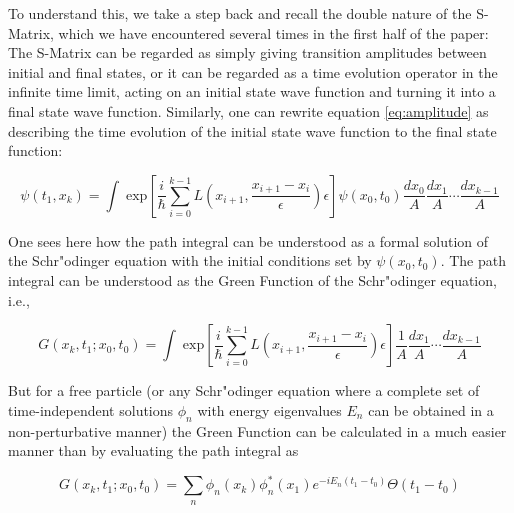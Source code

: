 \documentclass[12pt,a4paper]{article}
\begin{document}
To understand this, we take a step back and recall the double nature of the S-Matrix, which we have encountered several times in the first half of the paper: The S-Matrix can be regarded as simply giving transition amplitudes between initial and final states, or it can be regarded as a time evolution operator in the infinite time limit, acting on an initial state wave function and turning it into a final state wave function. Similarly, one can rewrite equation \ref{eq:amplitude} as describing the time evolution of the initial state wave function to the final state function:

\begin{equation}
\label{eq:amplitude2}
\psi (t_1, x_k)  =   \int  \; \mathrm{exp}\left[ \frac{i}{\hbar} \sum_{i=0}^{k-1} L \left( x_{i+1}, \frac{x_{i+1}-x_i}{\epsilon} \right) \epsilon \right] \psi (x_0, t_0) \frac{dx_0}{A} \frac{dx_1}{A} \cdots \frac{dx_{k-1}}{A} 
\end{equation}

One sees here how the path integral can be understood as a formal solution of the Schr"odinger equation with the initial conditions set by $\psi (x_0, t_0)$. The path integral can be understood as the Green Function of the Schr"odinger equation, i.e.,

\begin{equation}
G(x_k, t_1; x_0, t_0) = \int  \; \mathrm{exp}\left[ \frac{i}{\hbar} \sum_{i=0}^{k-1} L \left( x_{i+1}, \frac{x_{i+1}-x_i}{\epsilon} \right) \epsilon \right] \frac{1}{A} \frac{dx_1}{A} \cdots \frac{dx_{k-1}}{A}
\end{equation}

But for a free particle (or any Schr"odinger equation where a complete set of time-independent solutions $\phi_n$ with energy eigenvalues $E_n$ can be obtained in a non-perturbative manner) the Green Function can be calculated in a much easier manner than by evaluating the path integral as \citep[eq. 3]{feynman_1949_theory}

\begin{equation}
\label{eq:green}
G(x_k, t_1; x_0, t_0) = \sum_n \phi_n (x_k) \phi_n^{\ast} (x_1) e^{-i E_n (t_1 - t_0)} \Theta (t_1-t_0)
\end{equation}
\end{document}

